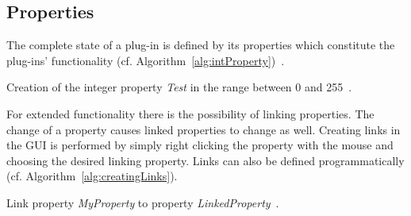 \subsection{Properties}
The complete state of a plug-in is defined by its properties which constitute the plug-ins' functionality (cf. Algorithm~\ref{alg:intProperty})~\cite{misc:volumeshop101}.
\begin{algorithm}
{}\;
\BlankLine
\caption{Creation of the integer property \emph{Test} in the range between 0 and 255~\cite{misc:volumeshop101}.}
\label{alg:intProperty}
\end{algorithm}

For extended functionality there is the possibility of linking properties. The change of a property causes linked properties to change as well. Creating links in the GUI is performed by simply right clicking the property with the mouse and choosing the desired linking property. Links can also be defined programmatically (cf. Algorithm~\ref{alg:creatingLinks}).
\begin{algorithm}
\;
\BlankLine
\caption{Link property \emph{MyProperty} to property \emph{LinkedProperty}~\cite{misc:volumeshop101}.}
\label{alg:creatingLinks}
\end{algorithm}


